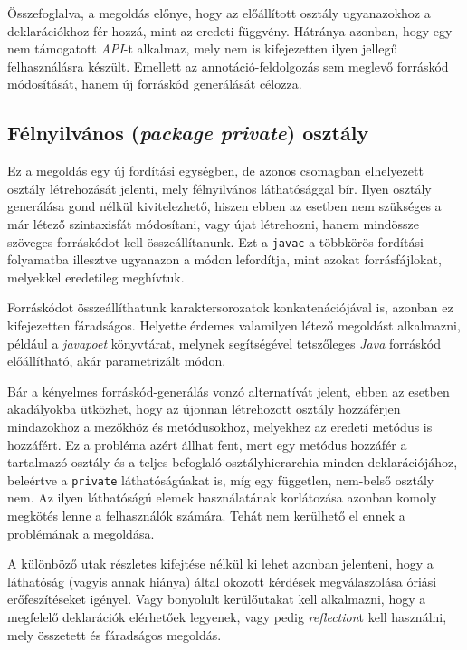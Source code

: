 Összefoglalva, a megoldás előnye, hogy az előállított osztály ugyanazokhoz a deklarációkhoz fér hozzá, mint az eredeti függvény. Hátránya azonban, hogy egy nem támogatott \textit{API}-t alkalmaz, mely nem is kifejezetten ilyen jellegű felhasználásra készült. Emellett az annotáció-feldolgozás sem meglevő forráskód módosítását, hanem új forráskód generálását célozza.

\subsection{Félnyilvános (\textit{package private}) osztály}

Ez a megoldás egy új fordítási egységben, de azonos csomagban elhelyezett osztály létrehozását jelenti, mely félnyilvános láthatósággal bír. Ilyen osztály generálása gond nélkül kivitelezhető, hiszen ebben az esetben nem szükséges a már létező szintaxisfát módosítani, vagy újat létrehozni, hanem mindössze szöveges forráskódot kell összeállítanunk. Ezt a \texttt{javac} a többkörös fordítási folyamatba illesztve ugyanazon a módon lefordítja, mint azokat forrásfájlokat, melyekkel eredetileg meghívtuk.

Forráskódot összeállíthatunk karaktersorozatok konkatenációjával is, azonban ez kifejezetten fáradságos. Helyette érdemes valamilyen létező megoldást alkalmazni, például a \textit{javapoet} könyvtárat, melynek segítségével tetszőleges \textit{Java} forráskód előállítható, akár parametrizált módon.

Bár a kényelmes forráskód-generálás vonzó alternatívát jelent, ebben az esetben akadályokba ütközhet, hogy az újonnan létrehozott osztály hozzáférjen mindazokhoz a mezőkhöz és metódusokhoz, melyekhez az eredeti metódus is hozzáfért. Ez a probléma azért állhat fent, mert egy metódus hozzáfér a tartalmazó osztály és a teljes befoglaló osztályhierarchia minden deklarációjához, beleértve a \texttt{private} láthatóságúakat is, míg egy független, nem-belső osztály nem. Az ilyen láthatóságú elemek használatának korlátozása azonban komoly megkötés lenne a felhasználók számára. Tehát nem kerülhető el ennek a problémának a megoldása.

A különböző utak részletes kifejtése nélkül ki lehet azonban jelenteni, hogy a láthatóság (vagyis annak hiánya) által okozott kérdések megválaszolása óriási erőfeszítéseket igényel. Vagy bonyolult kerülőutakat kell alkalmazni, hogy a megfelelő deklarációk elérhetőek legyenek, vagy pedig \textit{reflection}t kell használni, mely összetett és fáradságos megoldás.

